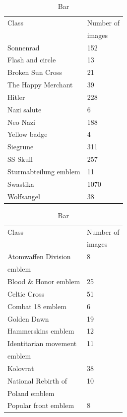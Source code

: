 \documentclass[11pt,a4paper,onecolumn]{article}
\begin{document}
\begin{table}[h]
  \parbox{.45\linewidth}{
    \centering
    \begin{tabular}{|l|l|}
      \hline
      Class & Number of \\
      & images\\
      \hline\hline
      Sonnenrad & 152 \\\hline
      Flash and circle & 13 \\\hline
      Broken Sun Cross & 21 \\\hline
      The Happy Merchant & 39 \\\hline
      Hitler & 228 \\\hline
      Nazi salute & 6 \\\hline
      Neo Nazi & 188 \\\hline
      Yellow badge & 4 \\\hline
      Siegrune & 311 \\\hline
      SS Skull & 257 \\\hline
      Sturmabteilung emblem & 11 \\\hline
      Swastika & 1070 \\\hline
      Wolfsangel & 38 \\\hline
    \end{tabular}
    \caption{Foo}
  }
  \hfill
  \parbox{.45\linewidth}{
    \centering
    \begin{tabular}{|l|l|}
      \hline
      Class & Number of\\
      & images\\
      \hline\hline
      Atomwaffen Division & 8 \\
      emblem & \\\hline
      Blood \& Honor emblem & 25 \\\hline
      Celtic Cross & 51 \\\hline
      Combat 18 emblem & 6 \\\hline
      Golden Dawn & 19 \\\hline
      Hammerskins emblem & 12 \\\hline
      Identitarian movement & 11 \\
      emblem & \\\hline
      Kolovrat & 38 \\\hline
      National Rebirth of  & 10 \\
      Poland emblem & \\\hline
      Popular front emblem & 8 \\\hline
    \end{tabular}
    \caption{Bar}
  }
  \label{tab:dataset}
\end{table}
\end{document}
